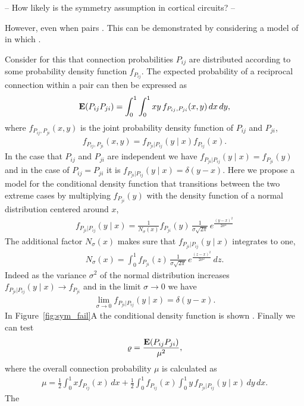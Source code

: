 
-- How likely is the symmetry assumption in cortical circuits? --

However, even when pairs . This can be demonstrated by considering a model of in which .

Consider for this that connection probabilities $P_{ij}$ are distributed according to some probability density function $f_{P_{ij}}$. The expected probability of a reciprocal connection within a pair can then be expressed as
%
\begin{align}
  \operatorname{\mathbf{E}}(P_{ij}P_{ji}) = \int_0^1 \int_0^1 xy\, f_{P_{ij},P_{ji}}(x,y) \, dx\, dy,
\end{align}
%
where $f_{P_{ij},P_{ji}}(x,y)$ is the joint probability density function of $P_{ij}$ and $P_{ji}$, 
%
\begin{align}
  f_{P_{ij},P_{ji}}(x,y) =  f_{P_{ji} | P_{ij}}(y \mid x) f_{P_{ij}}(x).
\end{align}
%
In the case that $P_{ij}$ and $P_{ji}$ are independent we have $f_{P_{ji} | P_{ij}}(y \mid x) = f_{P_{ji}}(y)$ and in the case of $P_{ij}=P_{ji}$ it is $f_{P_{ji} | P_{ij}}(y \mid x) = \delta(y-x)$.  Here we propose a model for the conditional density function that transitions between the two extreme cases by multiplying $f_{P_{ji}}(y)$ with the density function of a normal distribution centered around $x$,
%
\begin{align}
  f_{P_{ji} | P_{ij}} (y \mid x) = \frac{1}{N_{\sigma}(x)} f_{P_{ji}}(y)\, \frac{1}{\sigma \sqrt{2 \pi}} \,e^{\frac{(y-x)^2}{2 \sigma^2}} \label{eq:fpijpji}
\end{align}
%
The additional factor $N_{\sigma}(x)$  makes sure that $f_{P_{ji}|P_{ij}} (y \mid x)$ integrates to one,
%
\begin{align}
  N_{\sigma}(x) = \int_0^1 f_{P_{ji}}(z)\, \frac{1}{\sigma \sqrt{2 \pi}}\, e^{\frac{(z-x)^2}{2 \sigma^2}} \,dz.
\end{align}
%
Indeed as the variance $\sigma^2$ of the normal distribution increases $f_{P_{ji}|P_{ij}} (y \mid x) \to f_{P_{ji}}$ and in the limit $\sigma \to 0$ we have
\begin{align}
  \lim_{\sigma \to 0}   f_{P_{ji}|P_{ij}} (y \mid x) = \delta(y-x).
\end{align}
%
In Figure~\ref{fig:sym_fail}A the conditional density function is shown . Finally we can test
%
\begin{align}
  \varrho = \frac{\operatorname{\mathbf{E}}(P_{ij} P_{ji})}{\mu^2},
\end{align}
%
where the overall connection probability $\mu$ is calculated as
%
\begin{align}
 \mu = \frac{1}{2} \int_0^1 x f_{P_{ij}}(x)\,dx + \frac{1}{2} \int_0^1 f_{P_{ij}}(x) \int_0^1 y \,f_{P_{ji}\vert P_{ij}}(y \mid x) \,dy \, dx.
\end{align}
%
The

